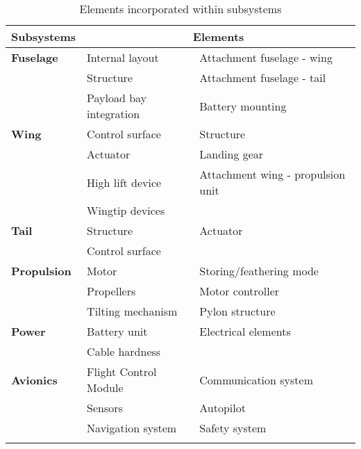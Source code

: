 \begin{table}[h]
\centering
\caption{Elements incorporated within subsystems}
\label{tab:elem_subs}
\begin{tabular}{lll}
\toprule
\textbf{Subsystems}     & \multicolumn{2}{c}{\textbf{Elements}}                               \\\midrule
\textbf{Fuselage}       & Internal layout            & Attachment fuselage - wing   \\
\textbf{}               & Structure                  & Attachment fuselage - tail   \\
\textbf{}               & Payload bay integration    & Battery mounting              \\\hdashline
\textbf{Wing}           & Control surface            & Structure                     \\
\textbf{}               & Actuator                   & Landing gear                  \\
\textbf{}               & High lift device           & Attachment wing - propulsion unit \\
                        & Wingtip devices            &                               \\\hdashline
\textbf{Tail}           & Structure                  & Actuator                      \\
\textbf{}               & Control surface            &                               \\\hdashline
\textbf{Propulsion}     & Motor                      & Storing/feathering mode       \\
\textbf{}               & Propellers                 & Motor controller              \\
\textbf{}               & Tilting mechanism          & Pylon structure               \\\hdashline
\textbf{Power}          & Battery unit               & Electrical elements           \\
\textbf{}               & Cable hardness             &                               \\\hdashline
\textbf{Avionics}       & Flight Control Module                        & Communication system          \\
\textbf{}               & Sensors                    & Autopilot                     \\
\textbf{}               & Navigation system          & Safety system                 \\\hdashline

\end{tabular}
\end{table}
